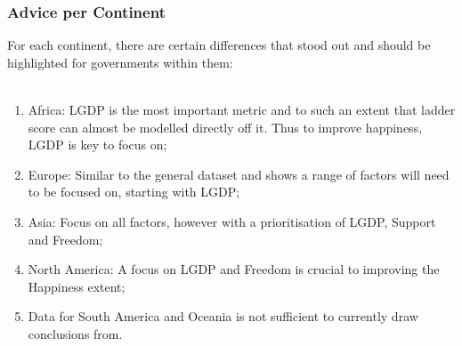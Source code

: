 \documentclass{beamer}
\begin{document}
% 
% 
% 
% 
% 
% 
% 
% 
\begin{frame}
  \frametitle{Advice per Continent}
  For each continent, there are certain differences that stood out and should be highlighted for governments within them: \\ \
  \begin{enumerate}
    \item Africa: LGDP is the most important metric and to such an extent that ladder score can almost be modelled directly off it. Thus to improve happiness, LGDP is key to focus on;
    \item Europe: Similar to the general dataset and shows a range of factors will need to be focused on, starting with LGDP;
    \item Asia: Focus on all factors, however with a prioritisation of  LGDP, Support and Freedom;
    \item North America: A focus on LGDP and Freedom is crucial to improving the Happiness extent;
    \item Data for South America and Oceania is not sufficient to currently draw conclusions from.
  \end{enumerate}
\end{frame}
% 
% 
% 
% 
% 
% 
\end{document}
